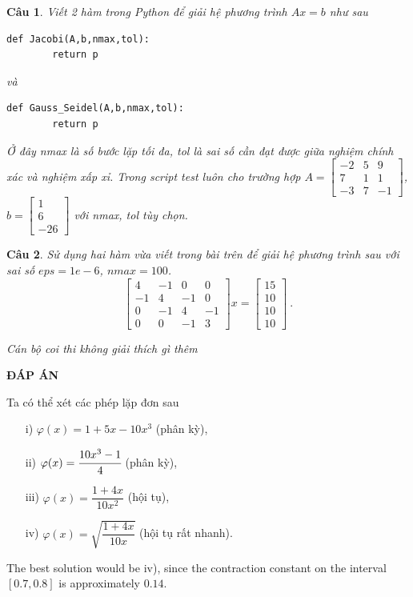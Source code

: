 \documentclass[11pt]{article}
\newtheorem{bt}{Câu}
\newcommand{\m}[1]{
	\begin{bmatrix}
		#1
	\end{bmatrix}
}
\begin{document}
\begin{bt}
	Viết 2 hàm trong Python để giải hệ phương trình $Ax=b$ như sau
	\begin{lstlisting}[frame=single] 
		def Jacobi(A,b,nmax,tol):
		return p
	\end{lstlisting}
	và
	\begin{lstlisting}[frame=single] 
		def Gauss_Seidel(A,b,nmax,tol):
		return p
	\end{lstlisting}
	Ở đây nmax là số bước lặp tối đa, tol là sai số cần đạt được giữa nghiệm chính xác và nghiệm xấp xỉ.
	Trong script test luôn cho trường hợp $A =\m{-2 & 5 & 9 \\ 7 & 1 & 1 \\ -3 & 7 & -1}$, $b=\m{1 \\ 6 \\ -26}$ với nmax, tol tùy chọn.
\end{bt}

\begin{bt} %
	Sử dụng hai hàm vừa viết trong bài trên để giải hệ phương trình sau với sai số $eps=1e-6$, $nmax=100$.
	\begin{equation*}
		\m{4 & -1 & 0 & 0 \\ -1 & 4 & -1 & 0 \\ 0 & -1 & 4 & -1 \\ 0 & 0 & -1 & 3} x = \m{15 \\ 10 \\ 10 \\ 10} \ .
	\end{equation*}
\end{bt}


\vspace{1cm}
 {\it Cán bộ coi thi không giải thích gì thêm}\\
\newpage
\begin{center}
{\LARGE{\bf ĐÁP ÁN}}
\end{center}

\begin{sol}
Ta có thể xét các phép lặp đơn sau 
\begin{enumerate}
\item[i)] $\varphi(x) = 1+5x-10x^3$ (phân kỳ),
\item[ii)] $\varphi(x) = \cfrac{10x^3-1}{4}$ (phân kỳ),
\item[iii)] $\varphi(x) = \dfrac{1+4x}{10x^2}$ (hội tụ),
\item[iv)] $\varphi(x) = \sqrt{\dfrac{1+4x}{10x}}$ (hội tụ rất nhanh).
\end{enumerate}
%
The best solution would be iv), since the contraction constant on the interval $[0.7,0.8]$ is approximately $0.14$.
\end{sol}
   
\end{document}
